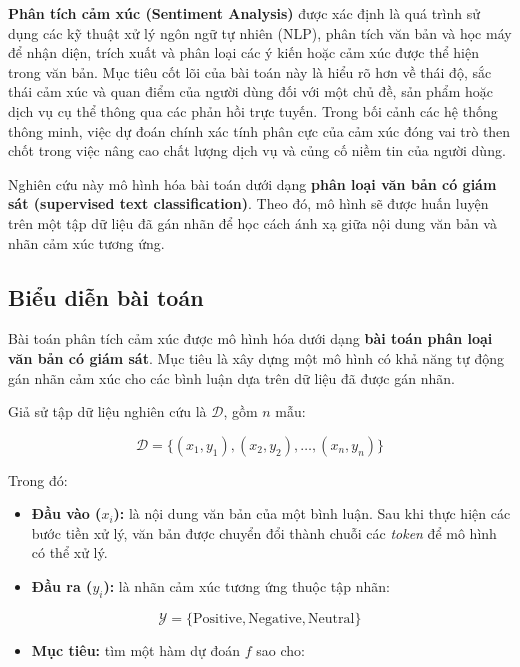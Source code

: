 \documentclass[14pt, a4paper]{report}
\begin{document}
\textbf{Phân tích cảm xúc (Sentiment Analysis)} được xác định là quá trình sử dụng các kỹ thuật xử lý ngôn ngữ tự nhiên (NLP), phân tích văn bản và học máy để nhận diện, trích xuất và phân loại các ý kiến hoặc cảm xúc được thể hiện trong văn bản. Mục tiêu cốt lõi của bài toán này là hiểu rõ hơn về thái độ, sắc thái cảm xúc và quan điểm của người dùng đối với một chủ đề, sản phẩm hoặc dịch vụ cụ thể thông qua các phản hồi trực tuyến. Trong bối cảnh các hệ thống thông minh, việc dự đoán chính xác tính phân cực của cảm xúc đóng vai trò then chốt trong việc nâng cao chất lượng dịch vụ và củng cố niềm tin của người dùng.

Nghiên cứu này mô hình hóa bài toán dưới dạng \textbf{phân loại văn bản có giám sát (supervised text classification)}. Theo đó, mô hình sẽ được huấn luyện trên một tập dữ liệu đã gán nhãn để học cách ánh xạ giữa nội dung văn bản và nhãn cảm xúc tương ứng.

\subsection{Biểu diễn bài toán}

Bài toán phân tích cảm xúc được mô hình hóa dưới dạng \textbf{bài toán phân loại văn bản có giám sát}. Mục tiêu là xây dựng một mô hình có khả năng tự động gán nhãn cảm xúc cho các bình luận dựa trên dữ liệu đã được gán nhãn.

Giả sử tập dữ liệu nghiên cứu là $\mathcal{D}$, gồm $n$ mẫu:

\begin{equation}
\mathcal{D} = \{ (x_1, y_1), (x_2, y_2), \ldots, (x_n, y_n) \}
\end{equation}

Trong đó:

\begin{itemize}
    \item \textbf{Đầu vào ($x_i$):} là nội dung văn bản của một bình luận. Sau khi thực hiện các bước tiền xử lý, văn bản được chuyển đổi thành chuỗi các \textit{token} để mô hình có thể xử lý.
    \item \textbf{Đầu ra ($y_i$):} là nhãn cảm xúc tương ứng thuộc tập nhãn:
\end{itemize}

\begin{equation}
\mathcal{Y} = \{ \text{Positive}, \text{Negative}, \text{Neutral} \}
\end{equation}

\begin{itemize}
    \item \textbf{Mục tiêu:} tìm một hàm dự đoán $f$ sao cho:
\end{itemize}
\end{document}
